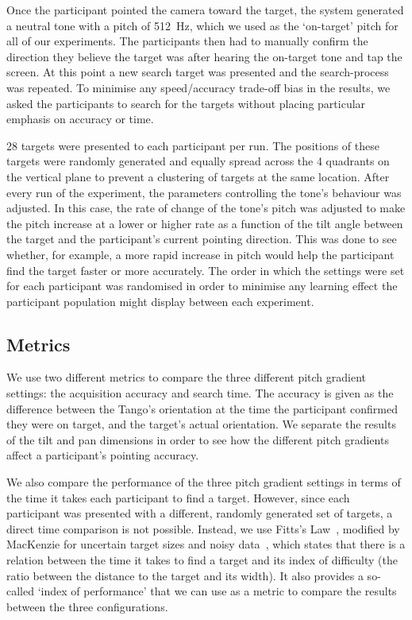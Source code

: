 \documentclass[sigconf, screen=true, anonymous=true]{acmart}
\begin{document}
Once the participant pointed the camera toward the target, the system generated a neutral tone with a pitch of \SI{512}{\hertz}, which we used as the `on-target' pitch for all of our experiments.
The participants then had to manually confirm the direction they believe the target was after hearing the on-target tone and tap the screen.
At this point a new search target was presented and the search-process was repeated.
To minimise any speed/accuracy trade-off bias in the results, we asked the participants to search for the targets without placing particular emphasis on accuracy or time. 

28 targets were presented to each participant per run.
The positions of these targets were randomly generated and equally spread across the 4 quadrants on the vertical plane to prevent a clustering of targets at the same location.
After every run of the experiment, the parameters controlling the tone's behaviour was adjusted.
In this case, the rate of change of the tone's pitch was adjusted to make the pitch increase at a lower or higher rate as a function of the tilt angle between the target and the participant's current pointing direction.
This was done to see whether, for example, a more rapid increase in pitch would help the participant find the target faster or more accurately.
The order in which the settings were set for each participant was randomised in order to minimise any learning effect the participant population might display between each experiment. 

\subsection{Metrics}

We use two different metrics to compare the three different pitch gradient settings: the acquisition accuracy and search time.
The accuracy is given as the difference between the Tango's orientation at the time the participant confirmed they were on target, and the target's actual orientation.
We separate the results of the tilt and pan dimensions in order to see how the different pitch gradients affect a participant's pointing accuracy. 

We also compare the performance of the three pitch gradient settings in terms of the time it takes each participant to find a target.
However, since each participant was presented with a different, randomly generated set of targets, a direct time comparison is not possible.
Instead, we use Fitts's Law~\cite{fitts1954information}, modified by MacKenzie for uncertain target sizes and noisy data~\cite{mackenzie1992fitts}, which states that there is a relation between the time it takes to find a target and its index of difficulty (the ratio between the distance to the target and its width).
It also provides a so-called `index of performance' that we can use as a metric to compare the results between the three configurations. 
\end{document}
